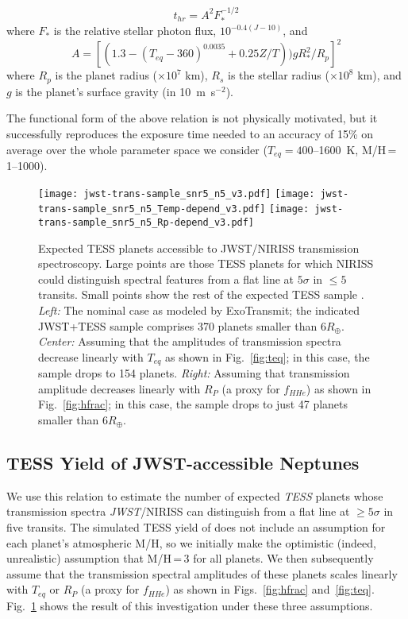 \documentclass[twocolumn]{aastex61}
\begin{document}
\begin{equation}
t_{hr} = A^2 F_*^{-1/2}
\end{equation}
where $F_*$ is the relative stellar photon flux,  $10^{-0.4(J-10)}$, and 
\begin{equation}
A = [(1.3 - (T_{eq}-360)^{0.0035} + 0.25Z/T)) g R_*^2/R_p]^2    
\end{equation}
where $R_p$ is the planet radius ($\times10^7$ km), $R_s$ is the stellar radius ($\times10^8$ km), and $g$ is the planet's surface gravity (in 10~m~s$^{-2}$).



The functional form of the above relation is not physically motivated,
but it successfully reproduces the exposure time needed to an accuracy
of 15\% on average over the whole parameter space we consider
($T_{eq}=400$--1600~K, M/H\,=\,1--1000).


\begin{figure*}
\texttt{[image: jwst-trans-sample\_snr5\_n5\_v3.pdf]}
\texttt{[image: jwst-trans-sample\_snr5\_n5\_Temp-depend\_v3.pdf]}
\texttt{[image: jwst-trans-sample\_snr5\_n5\_Rp-depend\_v3.pdf]}
\caption{Expected TESS planets accessible to JWST/NIRISS transmission spectroscopy. Large points are those TESS planets for which NIRISS  could distinguish spectral features from a flat line at $5\sigma$ in $\le5$ transits. Small points show the rest of the expected TESS sample \citep[from][]{sullivan:2015}. {\em Left:} The nominal case as modeled by ExoTransmit; the indicated JWST+TESS sample comprises 370 planets smaller than $6R_\oplus$. {\em Center:} Assuming that the amplitudes of transmission spectra  decrease linearly with $T_{eq}$ as shown in Fig.~\ref{fig:teq}; in this case, the sample drops to 154 planets. {\em Right:} Assuming that transmission amplitude decreases linearly with $R_P$ (a proxy for $f_{HHe}$) as shown in Fig.~\ref{fig:hfrac}; in this case, the sample drops to just 47 planets smaller than $6R_\oplus$.
\label{fig:tess_nominal}}
\end{figure*}


%
\subsection{TESS Yield of JWST-accessible Neptunes}
We use this relation to estimate the number of expected {\em TESS}
planets whose transmission spectra {\em JWST}/NIRISS can distinguish
from a flat line at $\ge 5 \sigma$ in five transits.  The simulated
TESS yield of \cite{sullivan:2015} does not include an assumption for
each planet's atmospheric M/H, so we initially make the optimistic
(indeed, unrealistic) assumption that M/H\,=\,3 for all planets. We
then subsequently assume that the transmission spectral amplitudes of
these planets scales linearly with $T_{eq}$ or $R_P$ (a proxy for
$f_{HHe}$) as shown in Figs.~\ref{fig:hfrac} and~\ref{fig:teq}.
Fig.~\ref{fig:tess_nominal} shows the result of this investigation
under these three assumptions.
\end{document}
